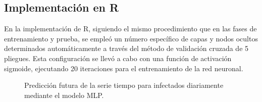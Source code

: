 \documentclass[
  us-letterpaper,
]{scrreprt}
\newenvironment{Shaded}{\begin{snugshade}}{\end{snugshade}}
\newcommand{\AttributeTok}[1]{\textcolor[rgb]{0.40,0.45,0.13}{#1}}
\newcommand{\DecValTok}[1]{\textcolor[rgb]{0.68,0.00,0.00}{#1}}
\newcommand{\FunctionTok}[1]{\textcolor[rgb]{0.28,0.35,0.67}{#1}}
\newcommand{\NormalTok}[1]{\textcolor[rgb]{0.00,0.23,0.31}{#1}}
\newcommand{\OtherTok}[1]{\textcolor[rgb]{0.00,0.23,0.31}{#1}}
\newcommand{\SpecialCharTok}[1]{\textcolor[rgb]{0.37,0.37,0.37}{#1}}
\newcommand{\StringTok}[1]{\textcolor[rgb]{0.13,0.47,0.30}{#1}}
\theoremstyle{plain}
\theoremstyle{definition}
\theoremstyle{definition}
\theoremstyle{plain}
\theoremstyle{remark}
\begin{document}
\subsection{Implementación en R}\label{implementaciuxf3n-en-r}

En la implementación de R, siguiendo el mismo procedimiento que en las
fases de entrenamiento y prueba, se empleó un número específico de capas
y nodos ocultos determinados automáticamente a través del método de
validación cruzada de 5 pliegues. Esta configuración se llevó a cabo con
una función de activación sigmoide, ejecutando 20 iteraciones para el
entrenamiento de la red neuronal.

\begin{Shaded}
\end{Shaded}

\begin{figure}


\caption{\label{fig-foremlp}Predicción futura de la serie tiempo para
infectados diariamente mediante el modelo MLP.}

\end{figure}%
\end{document}
